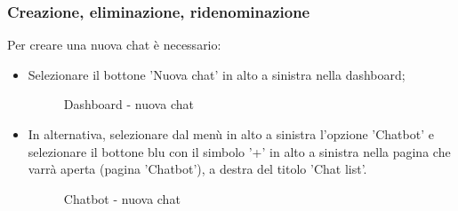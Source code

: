 \documentclass[10pt, a4paper]{article}
\begin{document}
\subsubsection{Creazione, eliminazione, ridenominazione}
Per creare una nuova chat è necessario:
\begin{itemize}
    \item Selezionare il bottone 'Nuova chat' in alto a sinistra nella dashboard;
    \begin{figure}[H]
        \centering  
        \caption{Dashboard - nuova chat}
    \end{figure}
    \item In alternativa, selezionare dal menù in alto a sinistra l'opzione 'Chatbot' e selezionare il bottone blu con il simbolo '+' in alto a sinistra nella pagina che varrà aperta (pagina 'Chatbot'), a destra del titolo 'Chat list'.
    \begin{figure}[H]
        \centering  
        \caption{Chatbot - nuova chat}
    \end{figure}
\end{itemize}
\end{document}
